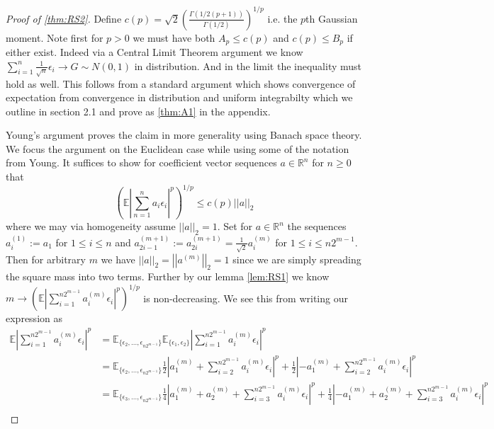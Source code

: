 \documentclass[10pt]{article}
\newcommand{\E}{\mathbb{E}}
\newcommand{\1}{\textbf{1}}
\newcommand{\R}{\mathbb{R}}
\newcommand{\norm}[1]{\left\lvert\left\lvert#1\right\rvert\right\rvert}
\newcommand{\normOne}[1]{\left\lvert#1\right\rvert}
\newcommand{\lparen}{\left(}
\newcommand{\rparen}{\right)}
\theoremstyle{remark}
\theoremstyle{definition}
\begin{document}
\begin{proof}[Proof of \ref{thm:RS2}]
	Define $c(p) = \sqrt{2}(\frac{\Gamma(1/2(p+1))}{\Gamma(1/2)})^{1/p}$ i.e. the $p$th Gaussian moment. Note first for $p > 0$ we must have both $A_p \leq c(p)$ and $c(p) \leq B_p$ if either exist. Indeed via a Central Limit Theorem argument we know $\sum_{i=1}^n \frac{1}{\sqrt{n}}\epsilon_i \to G \sim N(0,1)$ in distribution. And in the limit the inequality must hold as well. This follows from a standard argument which shows convergence of expectation from convergence in distribution and uniform integrabilty which we outline in section 2.1 and prove as \ref{thm:A1} in the appendix.

	Young's argument proves the claim in more generality using Banach space theory. We focus the argument on the Euclidean case while using some of the notation from Young. It suffices to show for coefficient vector sequences $a \in \R^n$ for $n \geq 0$ that 
	\begin{equation*}
		\lparen\E\normOne{\sum_{n=1}^{n}a_i\epsilon_i}^p\rparen^{1/p} \leq c(p)\norm{a}_2
	\end{equation*} where we may via homogeneity assume $\norm{a}_2 = 1$. 
	Set for $a \in \R^n$ the sequences $a_i^{(1)} := a_1$ for $1 \leq i \leq n$ and $a_{2i-1}^{(m+1)} := a_{2i}^{(m+1)} = \frac{1}{\sqrt{2}}a_i^{(m)}$ for $1 \leq i \leq n2^{m-1}$. Then for arbitrary $m$ we have $\norm{a}_2 = \norm{a^{(m)}}_2=1$ since we are simply spreading the square mass into two terms. Further by our lemma \ref{lem:RS1} we know $m \to \lparen\E\normOne{\sum_{i=1}^{n2^{m-1}}a_i^{(m)}\epsilon_i}^p\rparen^{1/p}$ is non-decreasing. We see this from writing our expression as
	\begin{align*}
		\E\normOne{\sum_{i=1}^{n2^{m-1}}a_i^{(m)}\epsilon_i}^p &= \E_{\{\epsilon_2,...,\epsilon_{n2^{m-1}}\}}\E_{\{\epsilon_1,\epsilon_2\}}\normOne{\sum_{i=1}^{n2^{m-1}}a_i^{(m)}\epsilon_i}^p \\
		&= \E_{\{\epsilon_2,...,\epsilon_{n2^{m-1}}\}}\frac{1}{2}\normOne{a_1^{(m)}+\sum_{i=2}^{n2^{m-1}}a_i^{(m)}\epsilon_i}^p+\frac{1}{2}\normOne{-a_1^{(m)}+\sum_{i=2}^{n2^{m-1}}a_i^{(m)}\epsilon_i}^p \\
		&= \E_{\{\epsilon_3,...,\epsilon_{n2^{m-1}}\}}\frac{1}{4}\normOne{a_1^{(m)}+a_2^{(m)}+\sum_{i=3}^{n2^{m-1}}a_i^{(m)}\epsilon_i}^p+\frac{1}{4}\normOne{-a_1^{(m)}+a_2^{(m)}+\sum_{i=3}^{n2^{m-1}}a_i^{(m)}\epsilon_i}^p  \\

\end{align*}
\end{proof}
\end{document}
